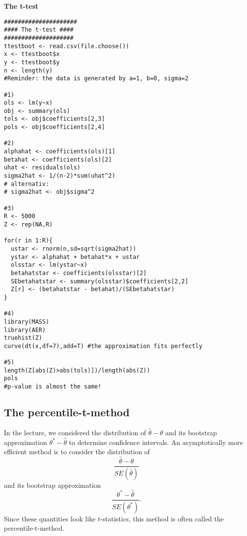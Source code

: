 \documentclass{article}
\begin{document}
\begin{solution}
\textbf{The t-test}

\begin{verbatim}
#####################
#### The t-test ####
####################
ttestboot <- read.csv(file.choose())
x <- ttestboot$x
y <- ttestboot$y
n <- length(y)
#Reminder: the data is generated by a=1, b=0, sigma=2

#1)
ols <- lm(y~x)
obj <- summary(ols)
tols <- obj$coefficients[2,3]
pols <- obj$coefficients[2,4]

#2)
alphahat <- coefficients(ols)[1]
betahat <- coefficients(ols)[2]
uhat <- residuals(ols)
sigma2hat <- 1/(n-2)*sum(uhat^2)
# alternativ:
# sigma2hat <- obj$sigma^2

#3)
R <- 5000
Z <- rep(NA,R)

for(r in 1:R){
  ustar <- rnorm(n,sd=sqrt(sigma2hat))
  ystar <- alphahat + betahat*x + ustar
  olsstar <- lm(ystar~x)
  betahatstar <- coefficients(olsstar)[2]
  SEbetahatstar <- summary(olsstar)$coefficients[2,2]
  Z[r] <- (betahatstar - betahat)/(SEbetahatstar)
}

#4)
library(MASS)
library(AER)
truehist(Z)
curve(dt(x,df=7),add=T) #the approximation fits perfectly

#5)
length(Z[abs(Z)>abs(tols)])/length(abs(Z))
pols
#p-value is almost the same!
\end{verbatim}
\end{solution}

\subsection{The percentile-t-method}

In the lecture, we considered the distribution of $\hat{\theta}-\theta $ and
its bootstrap approximation $\theta ^{\ast }-\hat{\theta}$ to determine
confidence intervals. An asymptotically more efficient method is to consider
the distribution of%
\begin{equation*}
\frac{\hat{\theta}-\theta }{SE(\hat{\theta})}
\end{equation*}%
and its bootstrap approximation%
\begin{equation*}
\frac{\theta ^{\ast }-\hat{\theta}}{SE(\theta ^{\ast })}.
\end{equation*}%
Since these quantities look like $t$-statistics, this method is often called
the percentile-t-method.
\end{document}
